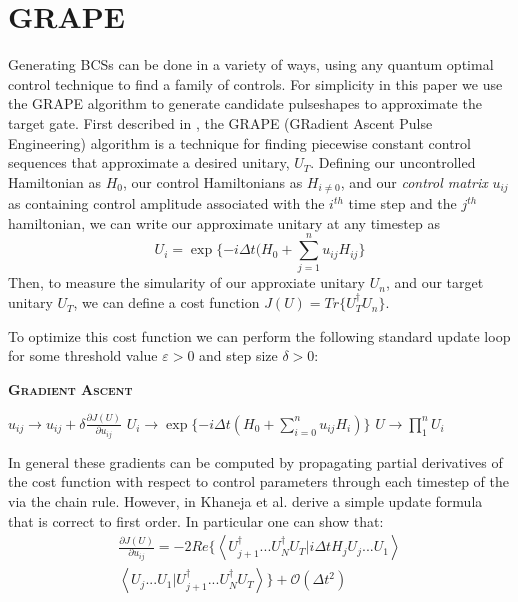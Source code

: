 \documentclass[aps,nofootinbib,pra,notitlepage,twocolumn]{revtex4-1}
\newcommand{\braket}[2]{\left\langle #1 | #2 \right\rangle}
\begin{document}
\section{GRAPE}\label{GRAPE}
Generating BCSs can be done in a variety of ways, using any quantum optimal control technique \cite{Caneva2011, Machnes2018} to find a family of controls. For simplicity in this paper we use the GRAPE algorithm to generate candidate pulseshapes to approximate the target gate. First described in \cite{Khaneja2005}, the GRAPE (GRadient Ascent Pulse Engineering) algorithm is a technique for finding piecewise constant control sequences that approximate a desired unitary, $U_T$. Defining our uncontrolled Hamiltonian as $H_0$, our control Hamiltonians as $H_{i\neq 0}$, and our \textit{control matrix} $u_{ij}$ as containing control amplitude associated with the $i^{th}$ time step and the $j^{th}$ hamiltonian, we can write our approximate unitary at any timestep as
\begin{equation}\label{eq:3}
  U_i = \exp\{-i\Delta t(H_0 + \sum_{j=1}^{n}u_{ij}H_{ij}\}
\end{equation}
Then, to measure the simularity of our approxiate unitary $U_n$, and our target unitary $U_T$, we can define a cost function $J(U) = Tr\{U_T^{\dagger}U_n\}$.

To optimize this cost function we can perform the following standard update loop for some threshold value $\varepsilon > 0$ and step size $\delta > 0$:
\begin{algorithm}[H]
  \caption{\textsc{\textbf{Gradient Ascent}}}
  \begin{algorithmic}
    \State $u_{ij} \rightarrow u_{ij} + \delta\frac{\partial J(U)}{\partial u_{ij}}$
    \State $U_i \rightarrow \exp\{-i\Delta t(H_0 + \sum_{i=0}^{n}u_{ij}H_i)\}$
    \EndFor
    \State $U \rightarrow \prod_1^nU_i$
    \EndWhile 
  \end{algorithmic}
\end{algorithm}

In general these gradients can be computed by propagating partial derivatives of the cost function with respect to control parameters through each timestep of the  via the chain rule. However, in \cite{Khaneja2005} Khaneja et al. derive a simple update formula that is correct to first order. In particular one can show that:
\begin{equation}\label{eq:update}
  \begin{split}
\frac{\partial J(U)}{\partial u_{ij}} = -2Re\{\braket{{U_{j+1}^{\dagger}...U_N^{\dagger} U_T}}{i\Delta tH_jU_j...U_1}\\
\braket{U_j...U_1}{U_{j+1}^{\dagger}...U_N^{\dagger} U_T}\} +  \mathcal{O}(\Delta t^2)
  \end{split}
\end{equation}
\end{document}
